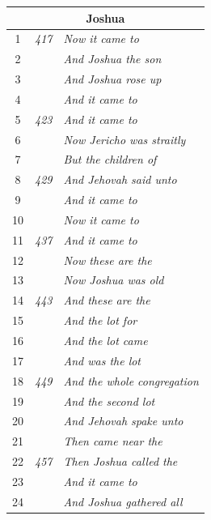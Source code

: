 \documentclass{article}
\newlength{\minipageheight}
\newlength{\minipagewidth}
\begin{document}
\begin{minipage}[r][\minipageheight][t]{\minipagewidth}
\begin{longtable}{ccl}
        \multicolumn{3}{c}{\textbf{Joshua}}                              \\
        \hline
        1           & \textit{417} & \textit{Now it came to}             \\
        2           &              & \textit{And Joshua the son}         \\
        3           &              & \textit{And Joshua rose up}         \\
        4           &              & \textit{And it came to}             \\
        5           & \textit{423} & \textit{And it came to}             \\
        6           &              & \textit{Now Jericho was straitly}   \\
        7           &              & \textit{But the children of}        \\
        8           & \textit{429} & \textit{And Jehovah said unto}      \\
        9           &              & \textit{And it came to}             \\
        10          &              & \textit{Now it came to}             \\
        11          & \textit{437} & \textit{And it came to}             \\
        12          &              & \textit{Now these are the}          \\
        13          &              & \textit{Now Joshua was old}         \\
        14          & \textit{443} & \textit{And these are the}          \\
        15          &              & \textit{And the lot for}            \\
        16          &              & \textit{And the lot came}           \\
        17          &              & \textit{And was the lot}            \\
        18          & \textit{449} & \textit{And the whole congregation} \\
        19          &              & \textit{And the second lot}         \\
        20          &              & \textit{And Jehovah spake unto}     \\
        21          &              & \textit{Then came near the}         \\
        22          & \textit{457} & \textit{Then Joshua called the}     \\
        23          &              & \textit{And it came to}             \\
        24          &              & \textit{And Joshua gathered all}    \\


\end{longtable}
\end{minipage}
\end{document}
